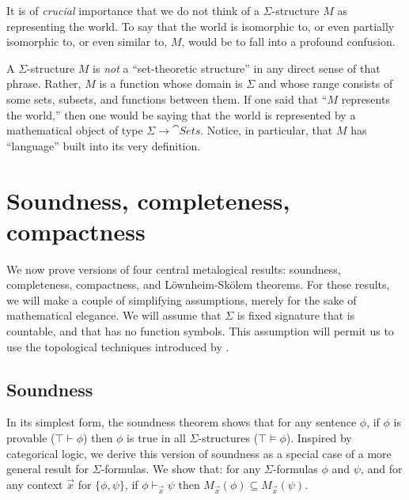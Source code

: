 \begin{box-thm} It is of {\it crucial} importance
  that we do not think of a $\Sigma$-structure $M$ as representing the
  world.  To say that the world is isomorphic to, or even partially
  isomorphic to, or even similar to, $M$, would be to fall into a
  profound confusion.

  A $\Sigma$-structure $M$ is {\it not} a ``set-theoretic structure''
  in any direct sense of that phrase.  Rather, $M$ is a function whose
  domain is $\Sigma$ and whose range consists of some sets, subsets,
  and functions between them.  If one said that ``$M$ represents the
  world,'' then one would be saying that the world is represented by a
  mathematical object of type $\Sigma\to\cat{Sets}$.  Notice, in
  particular, that $M$ has ``language'' built into its very
  definition. \end{box-thm}






\section{Soundness, completeness, compactness}

We now prove versions of four central metalogical results: soundness,
completeness, compactness, and L\"ownheim-Sk{\"olem} theorems.  For
these results, we will make a couple of simplifying assumptions,
merely for the sake of mathematical elegance.  We will assume that
$\Sigma$ is fixed signature that is countable, and that has no
function symbols.  This assumption will permit us to use the
topological techniques introduced by \cite{rasiowa}.


\subsection*{Soundness}

In its simplest form, the soundness theorem shows that for any
sentence $\phi$, if $\phi$ is provable ($\top\vdash\phi$) then $\phi$
is true in all $\Sigma$-structures ($\top\vDash\phi$).  Inspired by
categorical logic, we derive this version of soundness as a special
case of a more general result for $\Sigma$-formulas.  We show that:
for any $\Sigma$-formulas $\phi$ and $\psi$, and for any context
$\vec{x}$ for $\{ \phi ,\psi \}$, if $\phi\vdash _{\vec{x}}\psi$ then
$M_{\vec{x}}(\phi )\subseteq M_{\vec{x}}(\psi )$.

